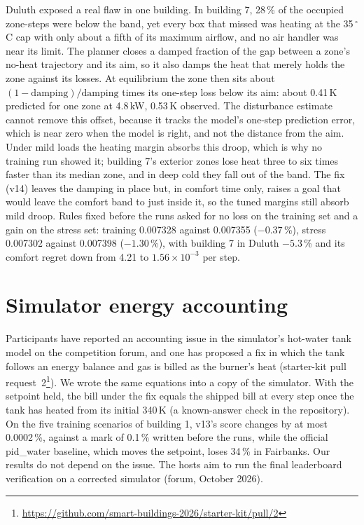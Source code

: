 \documentclass{article}
\begin{document}
Duluth exposed a real flaw in one building. In building 7, 28\,\% of the occupied zone-steps were below the band,
yet every box that missed was heating at the 35\,$^\circ$C cap with only about a fifth of its maximum airflow, and
no air handler was near its limit. The planner closes a damped fraction of the gap between a zone's no-heat trajectory
and its aim, so it also damps the heat that merely holds the zone against its losses. At equilibrium the zone then
sits about $(1-\mathrm{damping})/\mathrm{damping}$ times its one-step loss below its aim: about 0.41\,K predicted for one
zone at 4.8\,kW, 0.53\,K observed. The disturbance estimate cannot remove this offset, because it tracks the model's
one-step prediction error, which is near zero when the model is right, and not the distance from the aim. Under mild loads the heating margin absorbs this droop, which is why no training
run showed it; building 7's exterior zones lose heat three to six times faster than its median zone, and in deep cold
they fall out of the band. The fix (v14) leaves the damping in place but, in comfort time only, raises a goal
that would leave the comfort band to just inside it, so the tuned margins still absorb mild droop. Rules fixed
before the runs asked for no loss on the training set and a gain on the stress set: training 0.007328 against
0.007355 ($-0.37$\,\%), stress 0.007302 against 0.007398 ($-1.30$\,\%), with building 7 in Duluth $-5.3$\,\% and
its comfort regret down from 4.21 to $1.56\times10^{-3}$ per step.

\section{Simulator energy accounting}\label{app:tank}
Participants have reported an accounting issue in the simulator's hot-water tank model on the competition forum, and
one has proposed a fix in which the tank follows an energy balance and gas is billed as the burner's heat (starter-kit
pull request~2\footnote{\url{https://github.com/smart-buildings-2026/starter-kit/pull/2}}). We wrote the same
equations into a copy of the simulator. With the setpoint held, the bill under the fix equals the shipped bill at
every step once the tank has heated from its initial 340\,K (a known-answer check in the repository). On the five
training scenarios of building 1, v13's score changes by at most 0.0002\,\%, against a mark of 0.1\,\% written before
the runs, while the official pid\_water baseline, which moves the setpoint, loses 34\,\% in Fairbanks. Our results do
not depend on the issue. The hosts aim to run the final leaderboard verification on a corrected simulator (forum,
October 2026).
\end{document}
